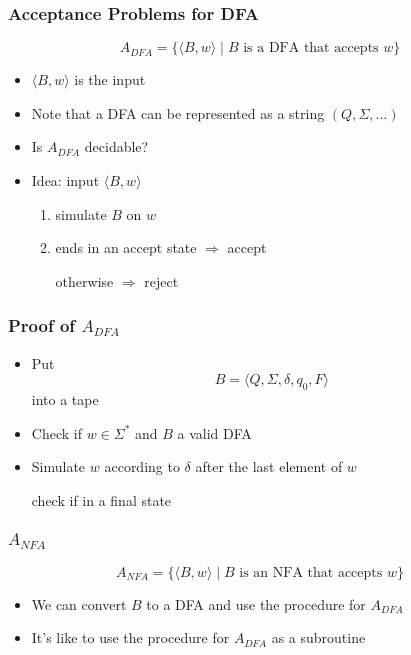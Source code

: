 \begin{frame}[allowframebreaks] \frametitle{Acceptance Problems for DFA}
\begin{equation*}
  A_{DFA}=
\{\langle  B,w\rangle\mid B \mbox{ is a DFA that accepts } w\}
\end{equation*}
  \begin{itemize}
\item $\langle  B,w\rangle$ is the input
\item [] Note that a DFA can be represented as a string $(Q, \Sigma, \ldots)$
\item Is $A_{DFA}$ decidable?

\item Idea: input $\langle  B,w\rangle$
  \begin{enumerate}
  \item simulate $B$ on $w$
  \item ends in an accept state $\Rightarrow$ accept

otherwise $\Rightarrow$ reject

  \end{enumerate}
\end{itemize}\end{frame} \begin{frame}[allowframebreaks] \frametitle{Proof of $A_{DFA}$}
  \begin{itemize}
  \item Put
    \begin{equation*}
    B=\langle  Q,\Sigma,\delta,q_0,F\rangle
  \end{equation*}
into a tape
\item Check if $w\in \Sigma^*$ and $B$ a valid DFA
\item Simulate $w$ according to $\delta$ after the last element of $w$

check if in a final state

\end{itemize}\end{frame} \begin{frame}[allowframebreaks] \frametitle{$A_{NFA}$}
\begin{equation*}
  A_{NFA}
=\{\langle  B,w\rangle \mid B \mbox{ is an NFA that accepts } w\}
\end{equation*}
  \begin{itemize}
\item We can convert $B$ to a DFA and 
use the procedure for $A_{DFA}$
\item It's like to use the procedure for $A_{DFA}$
as a subroutine


\end{itemize}
\end{frame}
